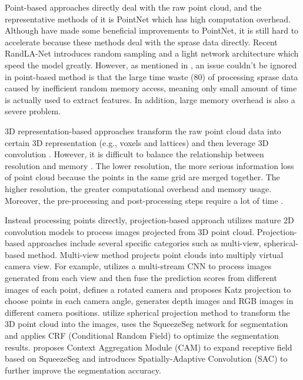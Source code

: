 \documentclass[conference]{IEEEtran}
\begin{document}
Point-based approaches directly deal with the raw point cloud, and the representative methods of it is PointNet which has high computation overhead. 
Although \cite{Qi2017PointNetDL,Li2018PointCNNCO} have made some beneficial improvements to PointNet, it is still hard to accelerate because these methods deal with the sprase data directly.
Recent RandLA-Net \cite{Hu2020RandLANetES} introduces random sampling and a light network architecture which speed the model greatly. However, as mentioned in \cite{Liu2019PointVoxelCF}, an issue couldn't be ignored in point-based method is that the large time waste (80) of processing sprase data caused by inefficient random memory access, meaning only small amount of time is actually used to extract features. In addition, large memory overhead is also a severe problem.


3D representation-based approaches transform the raw point cloud data into certain 3D representation (e.g., voxels and lattices) and then leverage 3D convolution  
\cite{Su2018SPLATNetSL, Rosu2020LatticeNetFP, Graham20183DSS,Tchapmi2017SEGCloudSS}. 
However, it is difficult to balance the relationship between resolution and memory \cite{Guo2020DeepLF,Liu2019PointVoxelCF}. The lower resolution, the more serious information loss of point cloud because the points in the same grid are merged together. The higher resolution, the greater computational overhead and memory usage. Moreover, the pre-processing and post-processing steps require a lot of time \cite{Qiu2021SemanticSF}. 

Instead processing points directly, projection-based approach utilizes mature 2D convolution models to process images projected from 3D point cloud.
Projection-based approaches include several specific categories such as multi-view, spherical-based method.
Multi-view method \cite{Lawin2017DeepP3,Tosteberg2017SemanticSO,Boulch2017UnstructuredPC} projects point clouds into multiply virtual camera view. 
For example, \cite{Lawin2017DeepP3} utilizes a multi-stream CNN to process images generated from each view and then fuse the prediction scores from different images of each point, \cite{Tosteberg2017SemanticSO} defines a rotated camera and proposes Katz projection to choose points in each camera angle, \cite{Boulch2017UnstructuredPC} generates depth images and RGB images in different camera positions. 
\cite{Wu2018SqueezeSegCN} utilize spherical projection method to transform the 3D point cloud into the images, uses the SqueezeSeg network for segmentation and applies CRF (Conditional Random Field) to optimize the segmentation results. \cite{Wu2019SqueezeSegV2IM} proposes Context Aggregation Module (CAM) to expand receptive field based on SqueezeSeg and \cite{Xu2020SqueezeSegV3SC} introduces Spatially-Adaptive Convolution (SAC) to further improve the segmentation accuracy. 
\end{document}

